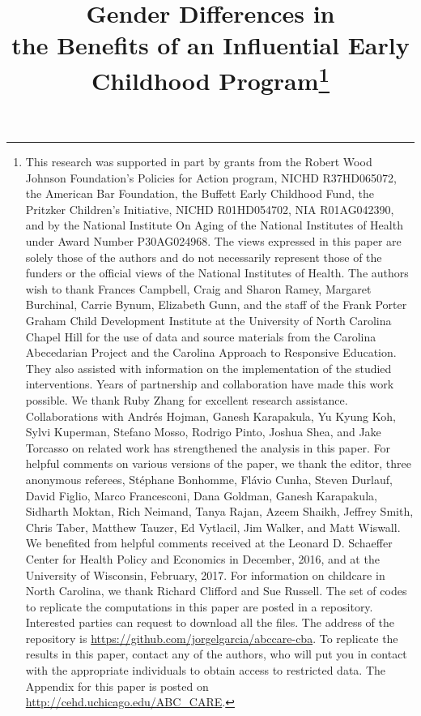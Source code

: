 \begin{titlepage}
\title{\Large \textbf{Gender Differences in\\ the Benefits of an Influential Early Childhood Program}\thanks{This research was supported in part by grants from the Robert Wood Johnson Foundation's Policies for Action program, NICHD R37HD065072, the American Bar Foundation, the Buffett Early Childhood Fund, the Pritzker Children's Initiative, NICHD R01HD054702, NIA R01AG042390, and by the National Institute On Aging of the National Institutes of Health under Award Number P30AG024968. The views expressed in this paper are solely those of the authors and do not necessarily represent those of the funders or the official views of the National Institutes of Health. The authors wish to thank Frances Campbell, Craig and Sharon Ramey, Margaret Burchinal, Carrie Bynum, Elizabeth Gunn, and the staff of the Frank Porter Graham Child Development Institute at the University of North Carolina Chapel Hill for the use of data and source materials from the Carolina Abecedarian Project and the Carolina Approach to Responsive Education. They also assisted with information on the implementation of the studied interventions. Years of partnership and collaboration have made this work possible. We thank Ruby Zhang for excellent research assistance. Collaborations with Andr\'{e}s Hojman, Ganesh Karapakula, Yu Kyung Koh, Sylvi Kuperman, Stefano Mosso, Rodrigo Pinto, Joshua Shea, and Jake Torcasso on related work has strengthened the analysis in this paper. For helpful comments on various versions of the paper, we thank the editor, three anonymous referees, St\'{e}phane Bonhomme, Fl\'{a}vio Cunha, Steven Durlauf, David Figlio, Marco Francesconi, Dana Goldman, Ganesh Karapakula, Sidharth Moktan, Rich Neimand, Tanya Rajan, Azeem Shaikh, Jeffrey Smith, Chris Taber, Matthew Tauzer, Ed Vytlacil, Jim Walker, and Matt Wiswall. We benefited from helpful comments received at the Leonard D. Schaeffer Center for Health Policy and Economics in December, 2016, and at the University of Wisconsin, February, 2017. For information on childcare in North Carolina, we thank Richard Clifford and Sue Russell. The set of codes to replicate the computations in this paper are posted in a repository. Interested parties can request to download all the files. The address of the repository is \url{https://github.com/jorgelgarcia/abccare-cba}. To replicate the results in this paper, contact any of the authors, who will put you in contact with the appropriate individuals to obtain access to restricted data. The Appendix for this paper is posted on \url{http://cehd.uchicago.edu/ABC_CARE}.}}


\end{titlepage}
